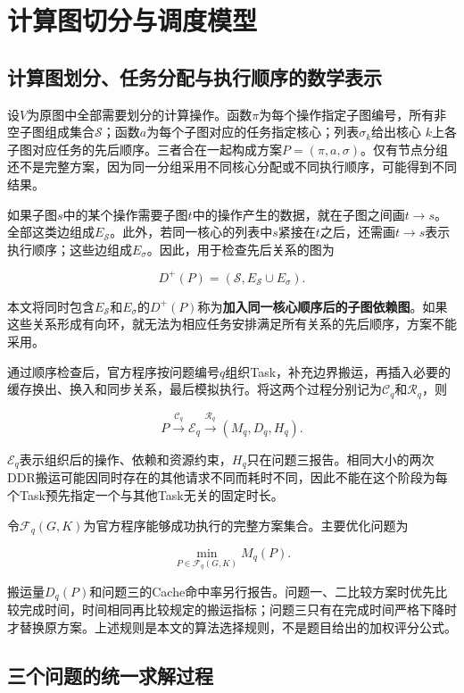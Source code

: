 \documentclass[anonymous,notoc]{gmcm2026}
\begin{document}
\section{计算图切分与调度模型}

\subsection{计算图划分、任务分配与执行顺序的数学表示}

设\(V\)为原图中全部需要划分的计算操作。函数\(\pi\)为每个操作指定子图编号，所有非空子图组成集合\(\mathcal S\)；函数\(a\)为每个子图对应的任务指定核心；列表\(\sigma_k\)给出核心 \(k\)上各子图对应任务的先后顺序。三者合在一起构成方案\(P=(\pi,a,\sigma)\)。仅有节点分组还不是完整方案，因为同一分组采用不同核心分配或不同执行顺序，可能得到不同结果。

如果子图\(s\)中的某个操作需要子图\(t\)中的操作产生的数据，就在子图之间画\(t\to s\)。全部这类边组成\(E_{\mathcal S}\)。此外，若同一核心的列表中\(s\)紧接在\(t\)之后，还需画\(t\to s\)表示执行顺序；这些边组成\(E_\sigma\)。因此，用于检查先后关系的图为

\[D^+(P)=(\mathcal S,E_{\mathcal S}\cup E_\sigma).\]

本文将同时包含\(E_{\mathcal S}\)和\(E_\sigma\)的\(D^+(P)\)称为\textbf{加入同一核心顺序后的子图依赖图}。如果这些关系形成有向环，就无法为相应任务安排满足所有关系的先后顺序，方案不能采用。

通过顺序检查后，官方程序按问题编号\(q\)组织Task，补充边界搬运，再插入必要的缓存换出、换入和同步关系，最后模拟执行。将这两个过程分别记为\(\mathcal C_q\)和\(\mathcal R_q\)，则

\[P\xrightarrow{\mathcal C_q}\mathcal E_q\xrightarrow{\mathcal R_q}(M_q,D_q,H_q).\]

\(\mathcal E_q\)表示组织后的操作、依赖和资源约束，\(H_q\)只在问题三报告。相同大小的两次DDR搬运可能因同时存在的其他请求不同而耗时不同，因此不能在这个阶段为每个Task预先指定一个与其他Task无关的固定时长。

令\(\mathcal F_q(G,K)\)为官方程序能够成功执行的完整方案集合。主要优化问题为

\[\min_{P\in\mathcal F_q(G,K)}M_q(P).\]

搬运量\(D_q(P)\)和问题三的Cache命中率另行报告。问题一、二比较方案时优先比较完成时间，时间相同再比较规定的搬运指标；问题三只有在完成时间严格下降时才替换原方案。上述规则是本文的算法选择规则，不是题目给出的加权评分公式。

\subsection{三个问题的统一求解过程}
\end{document}
